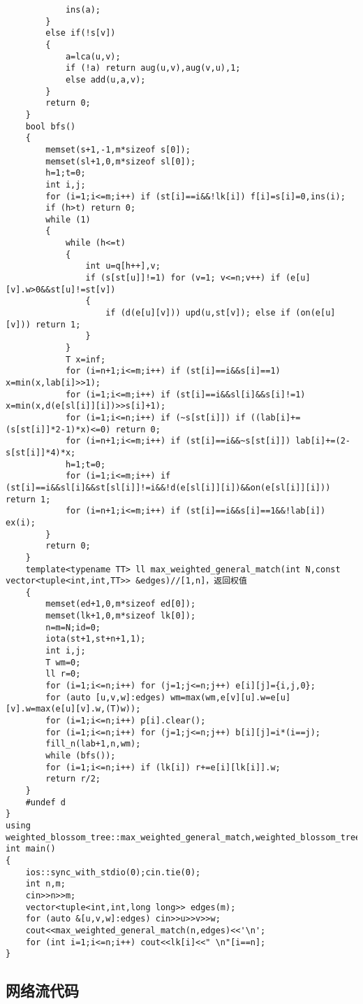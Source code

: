\documentclass{ctexart}
\begin{document}
\begin{lstlisting}
			ins(a);
		}
		else if(!s[v])
		{
			a=lca(u,v);
			if (!a) return aug(u,v),aug(v,u),1;
			else add(u,a,v);
		}
		return 0;
	}
	bool bfs()
	{
		memset(s+1,-1,m*sizeof s[0]);
		memset(sl+1,0,m*sizeof sl[0]);
		h=1;t=0;
		int i,j;
		for (i=1;i<=m;i++) if (st[i]==i&&!lk[i]) f[i]=s[i]=0,ins(i);
		if (h>t) return 0;
		while (1)
		{
			while (h<=t)
			{
				int u=q[h++],v;
				if (s[st[u]]!=1) for (v=1; v<=n;v++) if (e[u][v].w>0&&st[u]!=st[v])
				{
					if (d(e[u][v])) upd(u,st[v]); else if (on(e[u][v])) return 1;
				}
			}
			T x=inf;
			for (i=n+1;i<=m;i++) if (st[i]==i&&s[i]==1) x=min(x,lab[i]>>1);
			for (i=1;i<=m;i++) if (st[i]==i&&sl[i]&&s[i]!=1) x=min(x,d(e[sl[i]][i])>>s[i]+1);
			for (i=1;i<=n;i++) if (~s[st[i]]) if ((lab[i]+=(s[st[i]]*2-1)*x)<=0) return 0;
			for (i=n+1;i<=m;i++) if (st[i]==i&&~s[st[i]]) lab[i]+=(2-s[st[i]]*4)*x;
			h=1;t=0;
			for (i=1;i<=m;i++) if (st[i]==i&&sl[i]&&st[sl[i]]!=i&&!d(e[sl[i]][i])&&on(e[sl[i]][i])) return 1;
			for (i=n+1;i<=m;i++) if (st[i]==i&&s[i]==1&&!lab[i]) ex(i);
		}
		return 0;
	}
	template<typename TT> ll max_weighted_general_match(int N,const vector<tuple<int,int,TT>> &edges)//[1,n]，返回权值
	{
		memset(ed+1,0,m*sizeof ed[0]);
		memset(lk+1,0,m*sizeof lk[0]);
		n=m=N;id=0;
		iota(st+1,st+n+1,1);
		int i,j;
		T wm=0;
		ll r=0;
		for (i=1;i<=n;i++) for (j=1;j<=n;j++) e[i][j]={i,j,0};
		for (auto [u,v,w]:edges) wm=max(wm,e[v][u].w=e[u][v].w=max(e[u][v].w,(T)w));
		for (i=1;i<=n;i++) p[i].clear();
		for (i=1;i<=n;i++) for (j=1;j<=n;j++) b[i][j]=i*(i==j);
		fill_n(lab+1,n,wm);
		while (bfs());
		for (i=1;i<=n;i++) if (lk[i]) r+=e[i][lk[i]].w;
		return r/2;
	}
	#undef d
}
using weighted_blossom_tree::max_weighted_general_match,weighted_blossom_tree::lk;
int main()
{
	ios::sync_with_stdio(0);cin.tie(0);
	int n,m;
	cin>>n>>m;
	vector<tuple<int,int,long long>> edges(m);
	for (auto &[u,v,w]:edges) cin>>u>>v>>w;
	cout<<max_weighted_general_match(n,edges)<<'\n';
	for (int i=1;i<=n;i++) cout<<lk[i]<<" \n"[i==n];
}
\end{lstlisting}

\subsection{网络流代码}
\end{document}
